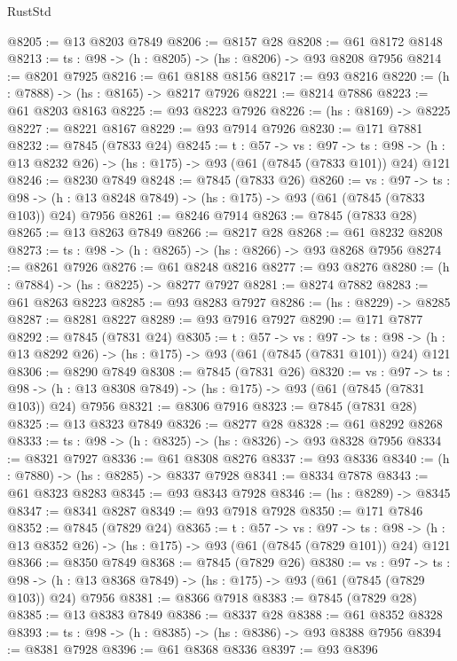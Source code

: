 \begin{lexlean}{RustStd}
\begin{coremodule}
@8205 := @13 @8203 @7849
@8206 := @8157 @28
@8208 := @61 @8172 @8148
@8213 := {ts : @98} -> (h : @8205) -> (hs : @8206) -> @93 @8208 @7956
@8214 := @8201 @7925
@8216 := @61 @8188 @8156
@8217 := @93 @8216
@8220 := (h : @7888) -> (hs : @8165) -> @8217 @7926
@8221 := @8214 @7886
@8223 := @61 @8203 @8163
@8225 := @93 @8223 @7926
@8226 := (hs : @8169) -> @8225
@8227 := @8221 @8167
@8229 := @93 @7914 @7926
@8230 := @171 @7881
@8232 := @7845 (@7833 @24)
@8245 := {t : @57} ->
  {vs : @97} ->
  {ts : @98} -> (h : @13 @8232 @26) -> (hs : @175) -> @93 (@61 (@7845 (@7833 @101)) @24) @121
@8246 := @8230 @7849
@8248 := @7845 (@7833 @26)
@8260 := {vs : @97} ->
  {ts : @98} -> (h : @13 @8248 @7849) -> (hs : @175) -> @93 (@61 (@7845 (@7833 @103)) @24) @7956
@8261 := @8246 @7914
@8263 := @7845 (@7833 @28)
@8265 := @13 @8263 @7849
@8266 := @8217 @28
@8268 := @61 @8232 @8208
@8273 := {ts : @98} -> (h : @8265) -> (hs : @8266) -> @93 @8268 @7956
@8274 := @8261 @7926
@8276 := @61 @8248 @8216
@8277 := @93 @8276
@8280 := (h : @7884) -> (hs : @8225) -> @8277 @7927
@8281 := @8274 @7882
@8283 := @61 @8263 @8223
@8285 := @93 @8283 @7927
@8286 := (hs : @8229) -> @8285
@8287 := @8281 @8227
@8289 := @93 @7916 @7927
@8290 := @171 @7877
@8292 := @7845 (@7831 @24)
@8305 := {t : @57} ->
  {vs : @97} ->
  {ts : @98} -> (h : @13 @8292 @26) -> (hs : @175) -> @93 (@61 (@7845 (@7831 @101)) @24) @121
@8306 := @8290 @7849
@8308 := @7845 (@7831 @26)
@8320 := {vs : @97} ->
  {ts : @98} -> (h : @13 @8308 @7849) -> (hs : @175) -> @93 (@61 (@7845 (@7831 @103)) @24) @7956
@8321 := @8306 @7916
@8323 := @7845 (@7831 @28)
@8325 := @13 @8323 @7849
@8326 := @8277 @28
@8328 := @61 @8292 @8268
@8333 := {ts : @98} -> (h : @8325) -> (hs : @8326) -> @93 @8328 @7956
@8334 := @8321 @7927
@8336 := @61 @8308 @8276
@8337 := @93 @8336
@8340 := (h : @7880) -> (hs : @8285) -> @8337 @7928
@8341 := @8334 @7878
@8343 := @61 @8323 @8283
@8345 := @93 @8343 @7928
@8346 := (hs : @8289) -> @8345
@8347 := @8341 @8287
@8349 := @93 @7918 @7928
@8350 := @171 @7846
@8352 := @7845 (@7829 @24)
@8365 := {t : @57} ->
  {vs : @97} ->
  {ts : @98} -> (h : @13 @8352 @26) -> (hs : @175) -> @93 (@61 (@7845 (@7829 @101)) @24) @121
@8366 := @8350 @7849
@8368 := @7845 (@7829 @26)
@8380 := {vs : @97} ->
  {ts : @98} -> (h : @13 @8368 @7849) -> (hs : @175) -> @93 (@61 (@7845 (@7829 @103)) @24) @7956
@8381 := @8366 @7918
@8383 := @7845 (@7829 @28)
@8385 := @13 @8383 @7849
@8386 := @8337 @28
@8388 := @61 @8352 @8328
@8393 := {ts : @98} -> (h : @8385) -> (hs : @8386) -> @93 @8388 @7956
@8394 := @8381 @7928
@8396 := @61 @8368 @8336
@8397 := @93 @8396

\end{coremodule}
\end{lexlean}
